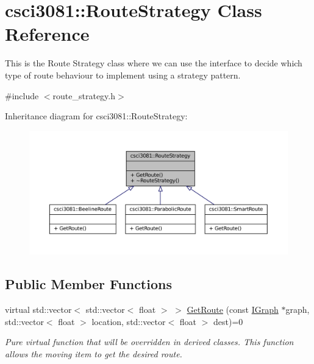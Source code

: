 \hypertarget{classcsci3081_1_1RouteStrategy}{}\section{csci3081\+:\+:Route\+Strategy Class Reference}
\label{classcsci3081_1_1RouteStrategy}


This is the Route Strategy class where we can use the interface to decide which type of route behaviour to implement using a strategy pattern.  




{\ttfamily \#include $<$route\+\_\+strategy.\+h$>$}



Inheritance diagram for csci3081\+:\+:Route\+Strategy\+:
\nopagebreak
\begin{figure}[H]
\begin{center}
\leavevmode
\includegraphics[width=350pt]{classcsci3081_1_1RouteStrategy__inherit__graph}
\end{center}
\end{figure}
\subsection*{Public Member Functions}
\begin{DoxyCompactItemize}
\item 
virtual std\+::vector$<$ std\+::vector$<$ float $>$ $>$ \hyperlink{classcsci3081_1_1RouteStrategy_a4bf67b185a4446324ebc13c1cda40cfe}{Get\+Route} (const \hyperlink{classentity__project_1_1IGraph}{I\+Graph} $\ast$graph, std\+::vector$<$ float $>$ location, std\+::vector$<$ float $>$ dest)=0
\begin{DoxyCompactList}\small\item\em Pure virtual function that will be overridden in derived classes. This function allows the moving item to get the desired route. \end{DoxyCompactList}\end{DoxyCompactItemize}


